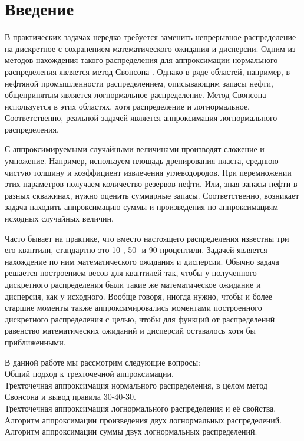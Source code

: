 \documentclass[12pt]{article}
\begin{document}
	
	
	
	\tableofcontents
	\pagebreak
	
	\section{Введение}
	
	В практических задачах нередко требуется заменить непрерывное распределение на
	дискретное с сохранением математического ожидания и дисперсии. Одним из методов
	нахождения такого распределения для аппроксимации нормального распределения является метод Свонсона \cite{Swansong}. Однако в ряде областей, например, в нефтяной промышленности распределением, описывающим запасы нефти, общепринятым является логнормальное распределение. Метод Свонсона используется в этих областях, хотя распределение и логнормальное. Соответственно, реальной задачей является аппроксимация логнормального распределения.
	
	С аппроксимируемыми случайными величинами производят сложение и умножение.
	Например, используем площадь дренирования пласта, среднюю чистую толщину и коэффициент извлечения углеводородов. При перемножении этих параметров получаем количество резервов нефти. Или, зная запасы нефти в разных скважинах, нужно оценить суммарные запасы.
	Соответственно, возникает задача находить аппроксимацию суммы и произведения по аппроксимациям исходных случайных величин.
	
	Часто бывает на практике, что вместо настоящего распределения известны три его квантили, стандартно это 10-, 50- и 90-процентили. Задачей является нахождение по ним математического ожидания и дисперсии. Обычно задача решается построением весов для квантилей так, чтобы у полученного дискретного распределения были такие же математическое ожидание и дисперсия, как у исходного. Вообще говоря, иногда нужно, чтобы и более старшие моменты также аппроксимировались моментами построенного дискретного распределения с целью, чтобы для функций от распределений равенство математических ожиданий и дисперсий оставалось хотя бы приближенными.
	
	В данной работе мы рассмотрим следующие вопросы:\\
	Общий подход к трехточечной аппроксимации.\\
	Трехточечная аппроксимация нормального распределения, в целом метод Свонсона и вывод правила 30-40-30.\\
	Трехточечная аппроксимация логнормального распределения и её свойства.\\
	Алгоритм аппроксимации произведения двух логнормальных распределений.\\
	Алгоритм аппроксимации суммы двух логнормальных распределений.
	
\end{document}
